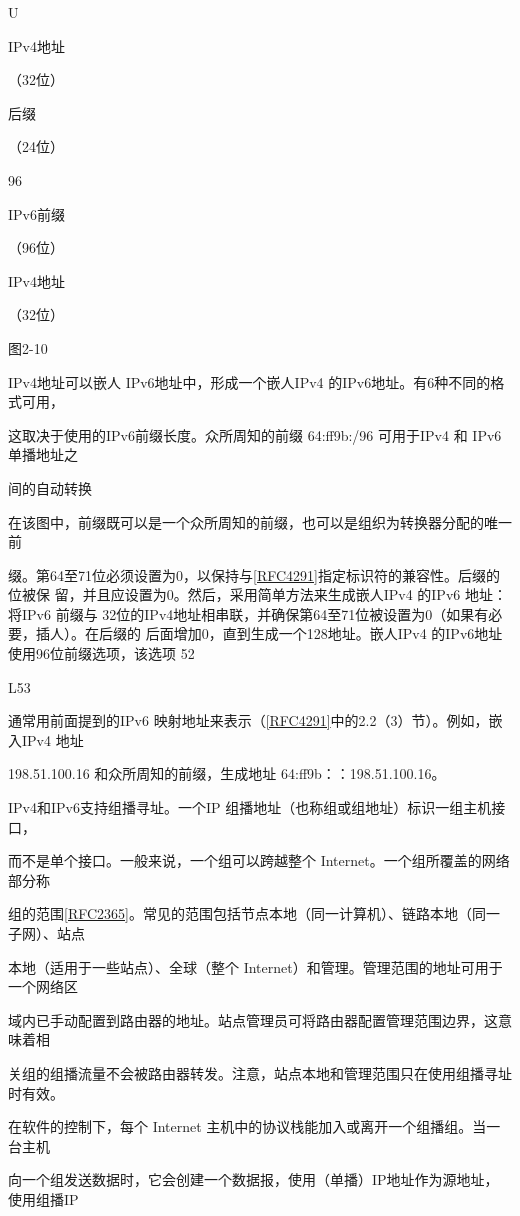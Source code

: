 U

IPv4地址

（32位）

后缀

（24位）

96

IPv6前缀

（96位）

IPv4地址

（32位）

图2-10

IPv4地址可以嵌人 IPv6地址中，形成一个嵌人IPv4 的IPv6地址。有6种不同的格式可用，

这取决于使用的IPv6前缀长度。众所周知的前缀 64:ff9b:/96 可用于IPv4 和 IPv6 单播地址之

间的自动转换

在该图中，前缀既可以是一个众所周知的前缀，也可以是组织为转换器分配的唯一前

缀。第64至71位必须设置为0，以保持与\href{https://www.rfc-editor.org/rfc/rfc4291}{[RFC4291]}指定标识符的兼容性。后缀的位被保
留，并且应设置为0。然后，采用简单方法来生成嵌人IPv4 的IPv6 地址：将IPv6 前缀与
32位的IPv4地址相串联，并确保第64至71位被设置为0（如果有必要，插人）。在后缀的
后面增加0，直到生成一个128地址。嵌人IPv4 的IPv6地址使用96位前缀选项，该选项
52

L53

通常用前面提到的IPv6 映射地址来表示（\href{https://www.rfc-editor.org/rfc/rfc4291}{[RFC4291]}中的2.2（3）节）。例如，嵌入IPv4 地址

198.51.100.16 和众所周知的前缀，生成地址 64:ff9b：：198.51.100.16。

IPv4和IPv6支持组播寻址。一个IP 组播地址（也称组或组地址）标识一组主机接口，

而不是单个接口。一般来说，一个组可以跨越整个 Internet。一个组所覆盖的网络部分称

组的范围\href{https://www.rfc-editor.org/rfc/rfc2365}{[RFC2365]}。常见的范围包括节点本地（同一计算机）、链路本地（同一子网）、站点

本地（适用于一些站点）、全球（整个 Internet）和管理。管理范围的地址可用于一个网络区

域内已手动配置到路由器的地址。站点管理员可将路由器配置管理范围边界，这意味着相

关组的组播流量不会被路由器转发。注意，站点本地和管理范围只在使用组播寻址时有效。

在软件的控制下，每个 Internet 主机中的协议栈能加入或离开一个组播组。当一台主机

向一个组发送数据时，它会创建一个数据报，使用（单播）IP地址作为源地址，使用组播IP

